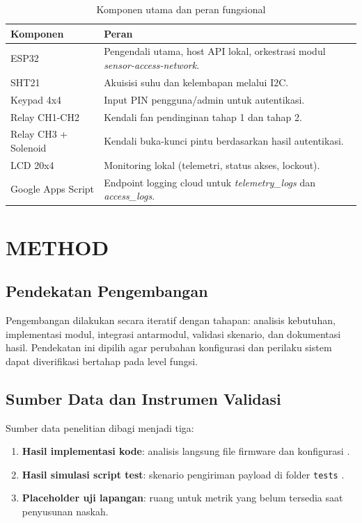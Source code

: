 \documentclass[10pt,a4paper,twocolumn]{article}
\begin{document}
\begin{table}[h]
\centering
\caption{Komponen utama dan peran fungsional}
\label{tab:komponen}
\begin{tabularx}{0.98\columnwidth}{p{}Y}
\toprule
\textbf{Komponen} & \textbf{Peran} \\ \midrule
ESP32 & Pengendali utama, host API lokal, orkestrasi modul \textit{sensor-access-network}. \\
SHT21 & Akuisisi suhu dan kelembapan melalui I2C. \\
Keypad 4x4 & Input PIN pengguna/admin untuk autentikasi. \\
Relay CH1-CH2 & Kendali fan pendinginan tahap 1 dan tahap 2. \\
Relay CH3 + Solenoid & Kendali buka-kunci pintu berdasarkan hasil autentikasi. \\
LCD 20x4 & Monitoring lokal (telemetri, status akses, lockout). \\
Google Apps Script & Endpoint logging cloud untuk \textit{telemetry\_logs} dan \textit{access\_logs}. \\
\bottomrule
\end{tabularx}
\end{table}

\section{METHOD}
\subsection{Pendekatan Pengembangan}
Pengembangan dilakukan secara iteratif dengan tahapan: analisis kebutuhan, implementasi modul, integrasi antarmodul, validasi skenario, dan dokumentasi hasil. Pendekatan ini dipilih agar perubahan konfigurasi dan perilaku sistem dapat diverifikasi bertahap pada level fungsi.

\subsection{Sumber Data dan Instrumen Validasi}
Sumber data penelitian dibagi menjadi tiga:
\begin{enumerate}[leftmargin=*,nosep]
\item \textbf{Hasil implementasi kode}: analisis langsung file firmware dan konfigurasi \cite{repo_firmware_2026}.
\item \textbf{Hasil simulasi script test}: skenario pengiriman payload di folder \texttt{tests} \cite{repo_tests_2026}.
\item \textbf{Placeholder uji lapangan}: ruang untuk metrik yang belum tersedia saat penyusunan naskah.
\end{enumerate}
\end{document}
